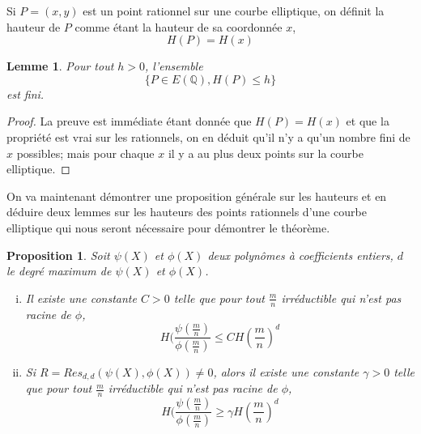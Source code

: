 \documentclass{article}
\newtheorem{proposition}{Proposition}
\newtheorem{lemme}{Lemme}
\begin{document}
Si $P=(x,y)$ est un point rationnel sur une courbe elliptique, on définit la hauteur de $P$ comme étant
la hauteur de sa coordonnée $x$,
\begin{equation*}
H(P) = H(x)
\end{equation*}

\begin{lemme}
Pour tout $h > 0$, l'ensemble
\begin{equation*}
\{P\in E(\mathbb{Q}), H(P) \leq h\}
\end{equation*}
est fini.
\end{lemme}

\begin{proof}
La preuve est immédiate étant donnée que $H(P) = H(x)$ et que la propriété est vrai sur les rationnels,
on en déduit qu'il n'y a qu'un nombre fini de $x$ possibles; mais pour chaque $x$ il y a au plus deux points
sur la courbe elliptique.
\end{proof}

On va maintenant démontrer une proposition générale sur les hauteurs et en déduire deux lemmes sur les
hauteurs des points rationnels d'une courbe elliptique qui nous seront nécessaire pour démontrer le théorème.

\begin{proposition}
Soit $\psi(X)$ et $\phi(X)$ deux polynômes à coefficients entiers, $d$ le degré maximum de $\psi(X)$ et $\phi(X)$.
\begin{enumerate}[(i)]
\item Il existe une constante $C > 0$ telle que pour tout $\frac{m}{n}$ irréductible qui n'est pas racine de $\phi$,
\begin{equation*}
H(\frac{\psi(\frac{m}{n})}{\phi(\frac{m}{n})} \leq C H(\frac{m}{n})^d
\end{equation*}
\item Si $R=Res_{d,d}(\psi(X), \phi(X))\neq 0$, alors il existe une constante $\gamma > 0$ telle que pour tout
$\frac{m}{n}$ irréductible qui n'est pas racine de $\phi$,
\begin{equation*}
H(\frac{\psi(\frac{m}{n})}{\phi(\frac{m}{n})} \geq \gamma H(\frac{m}{n})^d
\end{equation*}
\end{enumerate}
\end{proposition}
\end{document}

